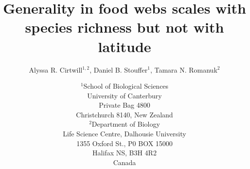 \documentclass[12pt]{article}
\begin{document}
\title{Generality in food webs scales with species richness but not with latitude}
\author{Alyssa R. Cirtwill$^{1,2}$, Daniel B. Stouffer$^{1}$, Tamara N. Romanuk$^{2}$}
\date{$^1$School of Biological Sciences\\University of Canterbury\\
Private Bag 4800\\Christchurch 8140, New Zealand \\
\medskip$^2$Department of Biology\\
Life Science Centre, Dalhousie University\\1355 Oxford St., P0 BOX 15000\\
Halifax NS, B3H 4R2\\ Canada\\}

\maketitle
\baselineskip=8.5mm
 
\vspace{-0.2 in}
\end{document}

